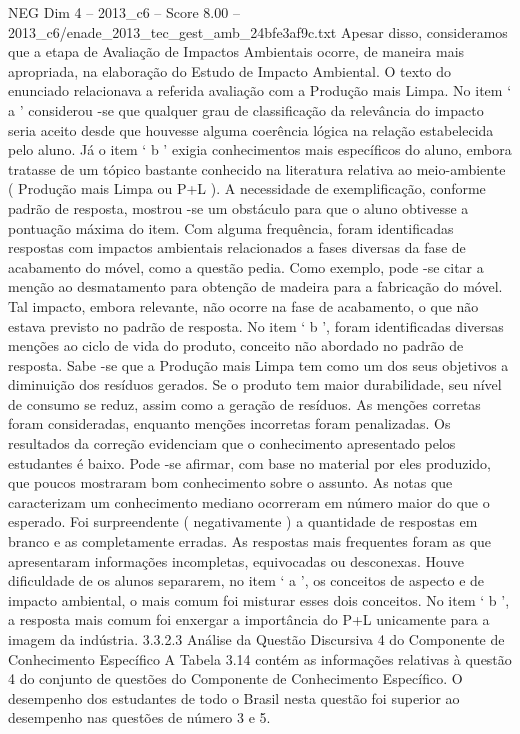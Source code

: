 \begin{textsample}{NEG Dim 4 – 2013\_c6 – Score 8.00 – 2013\_c6/enade\_2013\_tec\_gest\_amb\_24bfe3af9c.txt}
Apesar disso, consideramos que a etapa de Avaliação de Impactos Ambientais ocorre, de maneira mais apropriada, na elaboração do Estudo de Impacto Ambiental.
O texto do enunciado relacionava a referida avaliação com a Produção mais Limpa.
No item ‘ a ’ considerou -se que qualquer grau de classificação da relevância do impacto seria aceito desde que houvesse alguma coerência lógica na relação estabelecida pelo aluno.
Já o item ‘ b ’ exigia conhecimentos mais específicos do aluno, embora tratasse de um tópico bastante conhecido na literatura relativa ao meio-ambiente ( Produção mais Limpa ou P+L ).
A necessidade de exemplificação, conforme padrão de resposta, mostrou -se um obstáculo para que o aluno obtivesse a pontuação máxima do item.
Com alguma frequência, foram identificadas respostas com impactos ambientais relacionados a fases diversas da fase de acabamento do móvel, como a questão pedia.
Como exemplo, pode -se citar a menção ao desmatamento para obtenção de madeira para a fabricação do móvel.
Tal impacto, embora relevante, não ocorre na fase de acabamento, o que não estava previsto no padrão de resposta.
No item ‘ b ’, foram identificadas diversas menções ao ciclo de vida do produto, conceito não abordado no padrão de resposta.
Sabe -se que a Produção mais Limpa tem como um dos seus objetivos a diminuição dos resíduos gerados.
Se o produto tem maior durabilidade, seu nível de consumo se reduz, assim como a geração de resíduos.
As menções corretas foram consideradas, enquanto menções incorretas foram penalizadas.
Os resultados da correção evidenciam que o conhecimento apresentado pelos estudantes é baixo.
Pode -se afirmar, com base no material por eles produzido, que poucos mostraram bom conhecimento sobre o assunto.
As notas que caracterizam um conhecimento mediano ocorreram em número maior do que o esperado.
Foi surpreendente ( negativamente ) a quantidade de respostas em branco e as completamente erradas.
As respostas mais frequentes foram as que apresentaram informações incompletas, equivocadas ou desconexas.
Houve dificuldade de os alunos separarem, no item ‘ a ’, os conceitos de aspecto e de impacto ambiental, o mais comum foi misturar esses dois conceitos.
No item ‘ b ’, a resposta mais comum foi enxergar a importância do P+L unicamente para a imagem da indústria. 3.3.2.3 Análise da Questão Discursiva 4 do Componente de Conhecimento Específico A Tabela 3.14 contém as informações relativas à questão 4 do conjunto de questões do Componente de Conhecimento Específico.
O desempenho dos estudantes de todo o Brasil nesta questão foi superior ao desempenho nas questões de número 3 e 5.

\end{textsample}
